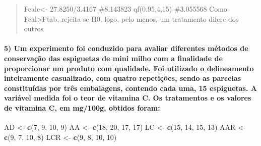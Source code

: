 \documentclass[
]{article}
\newenvironment{Shaded}{\begin{snugshade}}{\end{snugshade}}
\newcommand{\DecValTok}[1]{\textcolor[rgb]{0.00,0.00,0.81}{#1}}
\newcommand{\FunctionTok}[1]{\textcolor[rgb]{0.13,0.29,0.53}{\textbf{#1}}}
\newcommand{\NormalTok}[1]{#1}
\newcommand{\OtherTok}[1]{\textcolor[rgb]{0.56,0.35,0.01}{#1}}
\begin{document}
\begin{quote}
Fcalc\textless- 27.8250/3.4167 \#8.143823 qf(0.95,4,15) \#3.055568 Como
Fcal\textgreater Ftab, rejeita-se H0, logo, pelo menos, um tratamento
difere dos outros
\end{quote}

\hypertarget{um-experimento-foi-conduzido-para-avaliar-diferentes-muxe9todos-de-conservauxe7uxe3o-das-espiguetas-de-mini-milho-com-a-finalidade-de-proporcionar-um-produto-com-qualidade.-foi-utilizado-o-delineamento-inteiramente-casualizado-com-quatro-repetiuxe7uxf5es-sendo-as-parcelas-constituuxeddas-por-truxeas-embalagens-contendo-cada-uma-15-espiguetas.-a-variuxe1vel-medida-foi-o-teor-de-vitamina-c.-os-tratamentos-e-os-valores-de-vitamina-c-em-mg100g-obtidos-foram}{%
\paragraph{5) Um experimento foi conduzido para avaliar diferentes
métodos de conservação das espiguetas de mini milho com a finalidade de
proporcionar um produto com qualidade. Foi utilizado o delineamento
inteiramente casualizado, com quatro repetições, sendo as parcelas
constituídas por três embalagens, contendo cada uma, 15 espiguetas. A
variável medida foi o teor de vitamina C. Os tratamentos e os valores de
vitamina C, em mg/100g, obtidos
foram:}\label{um-experimento-foi-conduzido-para-avaliar-diferentes-muxe9todos-de-conservauxe7uxe3o-das-espiguetas-de-mini-milho-com-a-finalidade-de-proporcionar-um-produto-com-qualidade.-foi-utilizado-o-delineamento-inteiramente-casualizado-com-quatro-repetiuxe7uxf5es-sendo-as-parcelas-constituuxeddas-por-truxeas-embalagens-contendo-cada-uma-15-espiguetas.-a-variuxe1vel-medida-foi-o-teor-de-vitamina-c.-os-tratamentos-e-os-valores-de-vitamina-c-em-mg100g-obtidos-foram}}

\begin{Shaded}
\begin{Highlighting}[]
\NormalTok{AD }\OtherTok{\textless{}{-}} \FunctionTok{c}\NormalTok{(}\DecValTok{7}\NormalTok{, }\DecValTok{9}\NormalTok{, }\DecValTok{10}\NormalTok{, }\DecValTok{9}\NormalTok{)}
\NormalTok{AA }\OtherTok{\textless{}{-}} \FunctionTok{c}\NormalTok{(}\DecValTok{18}\NormalTok{, }\DecValTok{20}\NormalTok{, }\DecValTok{17}\NormalTok{, }\DecValTok{17}\NormalTok{)}
\NormalTok{LC }\OtherTok{\textless{}{-}} \FunctionTok{c}\NormalTok{(}\DecValTok{15}\NormalTok{, }\DecValTok{14}\NormalTok{, }\DecValTok{15}\NormalTok{, }\DecValTok{13}\NormalTok{)}
\NormalTok{AAR }\OtherTok{\textless{}{-}} \FunctionTok{c}\NormalTok{(}\DecValTok{9}\NormalTok{, }\DecValTok{7}\NormalTok{, }\DecValTok{10}\NormalTok{, }\DecValTok{8}\NormalTok{)}
\NormalTok{LCR }\OtherTok{\textless{}{-}} \FunctionTok{c}\NormalTok{(}\DecValTok{9}\NormalTok{, }\DecValTok{8}\NormalTok{, }\DecValTok{10}\NormalTok{, }\DecValTok{10}\NormalTok{)}
\end{Highlighting}
\end{Shaded}
\end{document}
